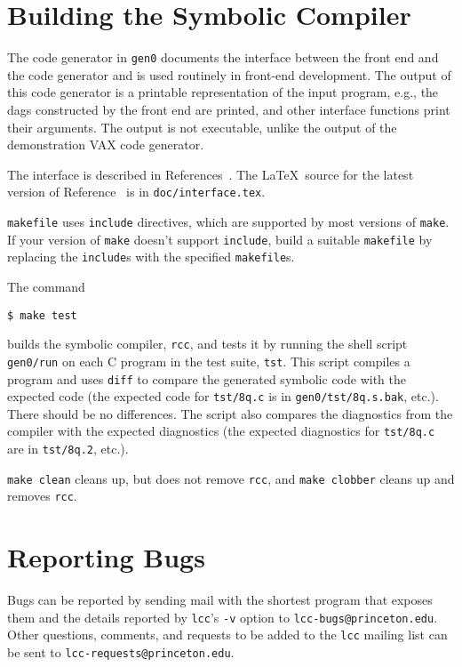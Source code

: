 \section{Building the Symbolic Compiler}\label{gen0}

The code generator in \verb|gen0| documents the
interface between the front end and the code generator and is used routinely in
front-end development. The output of this code generator is a printable
representation of the input program, e.g., the dags constructed by the
front end are printed, and other interface functions print their arguments.
The output is not executable, unlike the output of the demonstration
VAX code generator.

The interface is described in
References~\cite{fraser:hanson:interface:TR,fraser:hanson:91a}.
The \LaTeX\ source for the latest version of
Reference~\cite{fraser:hanson:interface:TR} is in \verb|doc/interface.tex|.

\verb|makefile| uses \verb|include| directives, which are supported by
most versions of \verb|make|. If your version of \verb|make|
doesn't support \verb|include|, build a suitable \verb|makefile|
by replacing the \verb|include|s with the specified \verb|makefile|s.

The command
\begin{verbatim}
$ make test
\end{verbatim}
builds the symbolic compiler, \verb|rcc|, and tests it by running the shell script
\verb|gen0/run| on each C program in the test suite, \verb|tst|.
This script compiles a program and uses \verb|diff| to compare the generated symbolic code
with the expected code (the expected code for \verb|tst/8q.c| is
in \verb|gen0/tst/8q.s.bak|, etc.). There should be no differences.
The script also compares the
diagnostics from the compiler with the expected diagnostics
(the expected diagnostics for \verb|tst/8q.c| are
in \verb|tst/8q.2|, etc.).

\verb|make clean| cleans up, but does not remove \verb|rcc|, and
\verb|make clobber| cleans up and removes \verb|rcc|.

\section{Reporting Bugs}\label{bugs}

Bugs can be reported by sending mail with the shortest program
that exposes them and the details reported by \verb|lcc|'s \verb|-v|
option to \verb|lcc-bugs@princeton.edu|.
Other questions, comments, and requests to be added
to the \verb|lcc| mailing list can be sent to \verb|lcc-requests@princeton.edu|.




